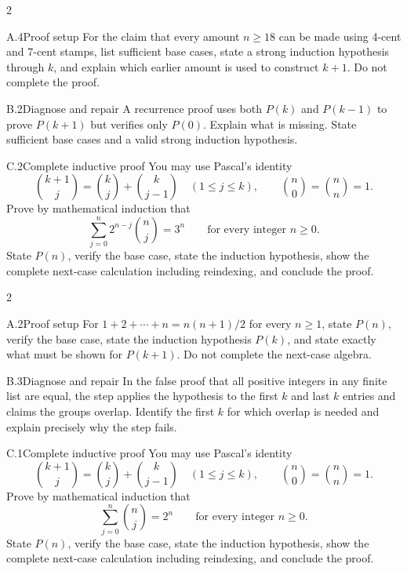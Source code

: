 \documentclass[9pt]{extarticle}
\begin{document}
\CoreWorkArea
\FormBreak
{}
\begin{multicols}{2}
\begin{CompactCoreProblem}{A.4}{Proof setup}
For the claim that every amount $n\ge18$ can be made using 4-cent and 7-cent stamps, list sufficient base cases, state a strong induction hypothesis through $k$, and explain which earlier amount is used to construct $k+1$. Do not complete the proof.
\end{CompactCoreProblem}
\begin{CompactCoreProblem}{B.2}{Diagnose and repair}
A recurrence proof uses both $P(k)$ and $P(k-1)$ to prove $P(k+1)$ but verifies only $P(0)$. Explain what is missing. State sufficient base cases and a valid strong induction hypothesis.
\end{CompactCoreProblem}
\end{multicols}
\begin{CompactCoreProblem}{C.2}{Complete inductive proof}
You may use Pascal's identity
\[
\binom{k+1}{j}=\binom{k}{j}+\binom{k}{j-1}
\quad(1\le j\le k),\qquad
\binom{n}{0}=\binom{n}{n}=1.
\]
Prove by mathematical induction that
\[
\sum_{j=0}^{n} 2^{n-j}\binom{n}{j}=3^n\qquad\text{for every integer }n\ge0.
\]
State $P(n)$, verify the base case, state the induction hypothesis, show the complete next-case calculation including reindexing, and conclude the proof.
\end{CompactCoreProblem}
\CoreWorkArea
\FormBreak
{}
\begin{multicols}{2}
\begin{CompactCoreProblem}{A.2}{Proof setup}
For $1+2+\cdots+n=n(n+1)/2$ for every $n\ge1$, state $P(n)$, verify the base case, state the induction hypothesis $P(k)$, and state exactly what must be shown for $P(k+1)$. Do not complete the next-case algebra.
\end{CompactCoreProblem}
\begin{CompactCoreProblem}{B.3}{Diagnose and repair}
In the false proof that all positive integers in any finite list are equal, the step applies the hypothesis to the first $k$ and last $k$ entries and claims the groups overlap. Identify the first $k$ for which overlap is needed and explain precisely why the step fails.
\end{CompactCoreProblem}
\end{multicols}
\begin{CompactCoreProblem}{C.1}{Complete inductive proof}
You may use Pascal's identity
\[
\binom{k+1}{j}=\binom{k}{j}+\binom{k}{j-1}
\quad(1\le j\le k),\qquad
\binom{n}{0}=\binom{n}{n}=1.
\]
Prove by mathematical induction that
\[
\sum_{j=0}^{n}\binom{n}{j}=2^n\qquad\text{for every integer }n\ge0.
\]
State $P(n)$, verify the base case, state the induction hypothesis, show the complete next-case calculation including reindexing, and conclude the proof.
\end{CompactCoreProblem}
\end{document}
